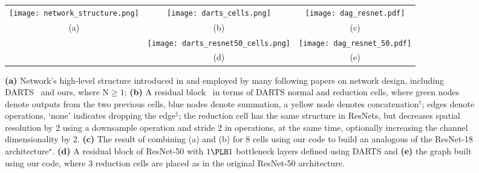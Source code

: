 \begin{figure}[tbhp]
	\vspace{-10pt}
	\centering
	\begin{tabular}{ccc}
		\texttt{[image: network\_structure.png]}
		& 
		\texttt{[image: darts\_cells.png]} 
		& 
		\texttt{[image: dag\_resnet.pdf]} \\
		(a) & (b) & (c) \\
		& \texttt{[image: darts\_resnet50\_cells.png]} 
		& \texttt{[image: dag\_resnet\_50.pdf]} \vspace{-15pt}\\
		& (d) & (e) \\
	\end{tabular}
	\vspace{-8pt}
	\caption{\small \textbf{(a)} Network's high-level structure introduced in \cite{zoph2018learning} and employed by many following papers on network design, including DARTS~\cite{liu2018darts} and ours, where N$\geq 1$; \textbf{(b)} A residual block~\cite{he2016deep} in terms of DARTS normal and reduction cells, where green nodes denote outputs from the two previous cells, blue nodes denote summation, a yellow node denotes concatenation$^\dagger$; edges denote operations, `none' indicates dropping the edge$^\ddagger$; the reduction cell has the same structure in ResNets, but decreases spatial resolution by 2 using a downsample operation and stride 2 in operations, at the same time, optionally increasing the channel dimensionality by 2. \textbf{(c)} The result of combining (a) and (b) for 8 cells using our code to build an analogous of the ResNet-18 architecture$^\star$.
		\textbf{(d)} A residual block of ResNet-50 with $1 \PLH 1$ bottleneck layers defined using DARTS and \textbf{(e)} the graph built using our code, where 3 reduction cells are placed as in the original ResNet-50 architecture. }
	\label{fig:darts_bg}
	\vspace{-20pt}
\end{figure}






